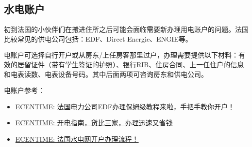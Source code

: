 \subsection{水电账户}

初到法国的小伙伴们在搬进住所之后可能会面临需要新办理用电账户的问题。法国比较常见的供电公司包括：EDF、Direct Energie、ENGIE等。

电账户可选择自行开户或从房东/上任房客那里过户，办理需要提供以下材料：有效的居留证件（带有学生签证的护照）、银行RIB、住房合同、上一任住户的信息和电表读数、电表设备号码。其中后面两项可咨询房东和供电公司。

电账户参考：
\begin{itemize}
    \item \href{https://www.ecentime.com/article/edf}{ECENTIME: 法国电力公司EDF办理保姆级教程来啦，手把手教你开户！}
    \item \href{https://www.ecentime.com/article/guide-electricite-comparaison-prix-bas}{ECENTIME: 开电指南，货比三家，办理迅速又省钱}
    \item \href{https://www.ecentime.com/article/edf-box-internet}{ECENTIME: 法国水电网开户办理流程！}
\end{itemize}
